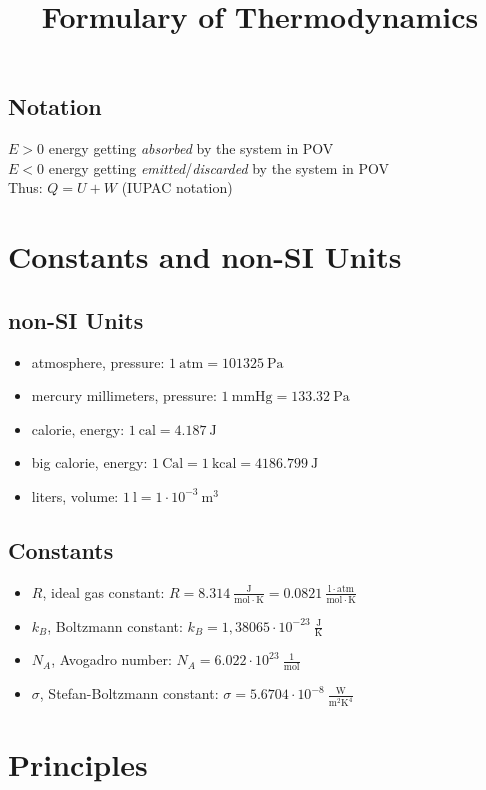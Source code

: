 \documentclass{aa}
\title{Formulary of Thermodynamics}
\begin{document}
\maketitle
\subsection{Notation}
$E>0$ energy getting \textit{absorbed} by the system in POV\\
$E<0$ energy getting \textit{emitted}/\textit{discarded} by the system in POV\\
Thus: $Q=U+W$ (IUPAC notation)
\section{Constants and non-SI Units}
\subsection{non-SI Units}
\begin{itemize}
\item atmosphere, pressure: $1\ \mathrm{ atm}=101325\ \mathrm{ Pa}$
\item mercury millimeters, pressure: $1\ \mathrm{ mmHg}=133.32\ \mathrm{ Pa}$
\item calorie, energy: $1\ \mathrm{ cal}=4.187\ \mathrm{ J}$
\item big calorie, energy: $1\ \mathrm{ Cal}=1\ \mathrm{kcal}=4186.799\ \mathrm{ J}$
\item liters, volume: $1\ \mathrm{ l}=1\cdot10^{-3}\ \mathrm{ m^3}$
\end{itemize}
\subsection{Constants}
\begin{itemize}
\item $R$, ideal gas constant: $R=8.314\ \mathrm{\frac{J}{mol\cdot K}}=0.0821\ \mathrm{\frac{l\cdot atm}{mol\cdot K}}$
\item $k_B$, Boltzmann constant: $k_B=1,38065\cdot10^{-23}\ \mathrm{\frac{J}{K}}$
\item $N_A$, Avogadro number: $N_A=6.022\cdot10^{23}\ \mathrm{\frac{1}{mol}}$
\item $\sigma$, Stefan-Boltzmann constant: $\sigma=5.6704\cdot10^{-8}\ \mathrm{\frac{W}{m^2K^4}}$
\end{itemize}
\section{Principles}
\end{document}
